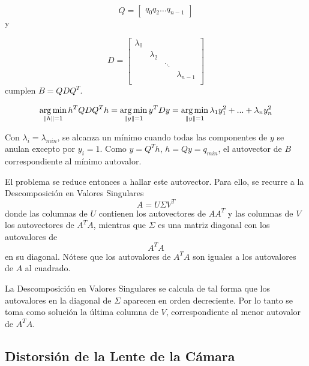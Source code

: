 \begin{equation}
    Q = \begin{bmatrix}
            q_{0} q_{2} \dots q_{n-1}
        \end{bmatrix}
\end{equation}
y

\begin{equation}
    D = \begin{bmatrix}
            \lambda_{0} & & & \\
                        & \lambda_{2} & & \\
                        & & \ddots & \\
                        & & & \lambda_{n-1}\\
        \end{bmatrix}
\end{equation}
cumplen $B = QDQ^{T}$.

\begin{equation}
    \operatorname*{arg\,min}_{\left\lVert h\right\rVert=1} h^{T}QDQ^{T}h = \operatorname*{arg\,min}_{\left\lVert y\right\rVert=1} y^{T}Dy = \operatorname*{arg\,min}_{\left\lVert y\right\rVert=1} \lambda_{1}y^{2}_{1} + ... + \lambda_{n}y^{2}_{n}
\end{equation}

Con $\lambda_{i} = \lambda_{min}$, se alcanza un mínimo cuando todas las componentes de $y$ se anulan excepto por $y_{i} = 1$. Como $y = Q^{T}h$,
$h=Qy = q_{min}$, el autovector de $B$ correspondiente al mínimo autovalor.

El problema se reduce entonces a hallar este autovector. Para ello, se recurre a la Descomposición en Valores Singulares
\begin{equation}
    A = U\Sigma V^{T}
\end{equation}
donde las columnas de $U$ contienen los autovectores de $AA^{T}$ y las columnas de $V$ los autovectores de $A^{T}A$, mientras que $\Sigma$ es una matriz
diagonal con los autovalores de $$A^{T}A$$ en su diagonal. Nótese que los autovalores de $A^{T}A$ son iguales a los autovalores de $A$ al cuadrado.

La Descomposición en Valores Singulares se calcula de tal forma que los autovalores en la diagonal de $\Sigma$ aparecen en orden decreciente. Por lo tanto
se toma como solución la última columna de $V$, correspondiente al menor autovalor de $A^{T}A$.

\subsection{Distorsión de la Lente de la Cámara}


